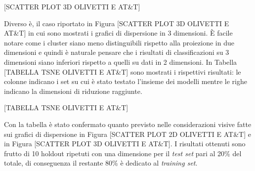 \documentclass[12pt,italian]{report}
\begin{document}
[SCATTER PLOT 3D OLIVETTI E AT\&T]

Diverso è, il caso riportato in Figura [SCATTER PLOT 3D OLIVETTI E AT\&T] in cui sono mostrati i grafici di dispersione in 3 dimensioni. È facile notare come i cluster siano meno distinguibili rispetto alla proiezione in due dimensioni e quindi è naturale pensare che i risultati di classificazioni su 3 dimensioni siano inferiori rispetto a quelli su dati in 2 dimensioni. In Tabella [TABELLA TSNE OLIVETTI E AT\&T] sono mostrati i rispettivi risultati: le colonne indicano i set su cui è stato testato l'insieme dei modelli mentre le righe indicano la dimensioni di riduzione raggiunte. 

[TABELLA TSNE OLIVETTI E AT\&T]

Con la tabella è stato confermato quanto previsto nelle considerazioni visive fatte sui grafici di dispersione in Figura [SCATTER PLOT 2D OLIVETTI E AT\&T] e in Figura [SCATTER PLOT 3D OLIVETTI E AT\&T]. I risultati ottenuti sono frutto di 10 holdout ripetuti con una dimensione per il \emph{test set} pari al 20\% del totale, di conseguenza il restante 80\% è dedicato al \emph{training set}. 
\end{document}
